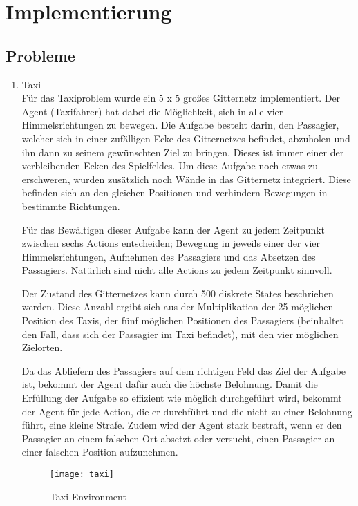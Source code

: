 \section{Implementierung}


\subsection{Probleme} \label{Probleme}

\begin{enumerate}
    \item Taxi\\
    Für das Taxiproblem \cite{faramaGymnasiumDocumentation} wurde ein 5 x 5 großes Gitternetz implementiert. Der Agent (Taxifahrer) hat dabei die Möglichkeit, sich in alle vier Himmelsrichtungen zu bewegen. Die Aufgabe besteht darin, den Passagier, welcher sich in einer zufälligen Ecke des Gitternetzes befindet, abzuholen und ihn dann zu seinem gewünschten Ziel zu bringen. Dieses ist immer einer der verbleibenden Ecken des Spielfeldes. Um diese Aufgabe noch etwas zu erschweren, wurden zusätzlich noch Wände in das Gitternetz integriert. Diese befinden sich an den gleichen Positionen und verhindern Bewegungen in bestimmte Richtungen.

    Für das Bewältigen dieser Aufgabe kann der Agent zu jedem Zeitpunkt zwischen sechs Actions entscheiden; Bewegung in jeweils einer der vier Himmelsrichtungen, Aufnehmen des Passagiers und das Absetzen des Passagiers. Natürlich sind nicht alle Actions zu jedem Zeitpunkt sinnvoll. 

    Der Zustand des Gitternetzes kann durch 500 diskrete States beschrieben werden. Diese Anzahl ergibt sich aus der Multiplikation der 25 möglichen Position des Taxis, der fünf möglichen Positionen des Passagiers (beinhaltet den Fall, dass sich der Passagier im Taxi befindet), mit den vier möglichen Zielorten.

    Da das Abliefern des Passagiers auf dem richtigen Feld das Ziel der Aufgabe ist, bekommt der Agent dafür auch die höchste Belohnung. Damit die Erfüllung der Aufgabe so effizient wie möglich durchgeführt wird, bekommt der Agent für jede Action, die er durchführt und die nicht zu einer Belohnung führt, eine kleine Strafe. Zudem wird der Agent stark bestraft, wenn er den Passagier an einem falschen Ort absetzt oder versucht, einen Passagier an einer falschen Position aufzunehmen.
    \begin{figure}[H]
        \centering
        \texttt{[image: taxi]}
        \caption{Taxi Environment}
        \label{fig:taxi_env}
    \end{figure}
    

\end{enumerate}
